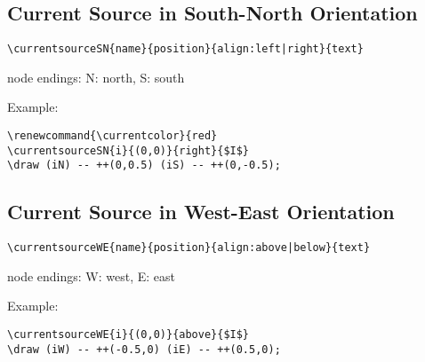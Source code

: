 \documentclass[parskip=full]{scrartcl}
\begin{document}
\subsection{Current Source in South-North Orientation}

\begin{verbatim}
\currentsourceSN{name}{position}{align:left|right}{text}
\end{verbatim}
node endings: N: north, S: south

Example:\\
\begin{minipage}{0.8\textwidth}
\begin{verbatim}
\renewcommand{\currentcolor}{red}
\currentsourceSN{i}{(0,0)}{right}{$I$}
\draw (iN) -- ++(0,0.5) (iS) -- ++(0,-0.5);
\end{verbatim}
\end{minipage}
\begin{minipage}{0.19\textwidth}
\end{minipage}

\subsection{Current Source in West-East Orientation}

\begin{verbatim}
\currentsourceWE{name}{position}{align:above|below}{text}
\end{verbatim}
node endings: W: west, E: east

Example:\\
\begin{minipage}{0.8\textwidth}
\begin{verbatim}
\currentsourceWE{i}{(0,0)}{above}{$I$}
\draw (iW) -- ++(-0.5,0) (iE) -- ++(0.5,0);
\end{verbatim}
\end{minipage}
\begin{minipage}{0.19\textwidth}
\end{minipage}
\end{document}
